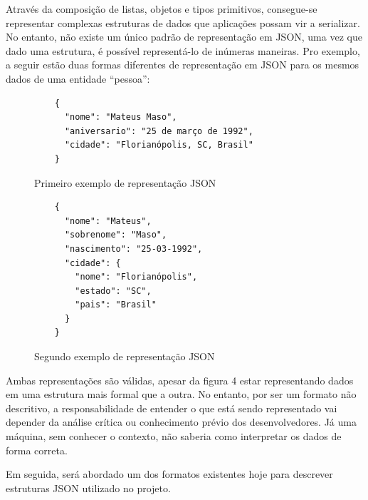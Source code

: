 \begin{table}[H]
  \centering
  \caption{Exemplo de tipos de valores em JSON}
\end{table}

Através da composição de listas, objetos e tipos primitivos, consegue-se representar complexas estruturas de dados que aplicações possam vir a serializar. No entanto, não existe um único padrão de representação em JSON, uma vez que dado uma estrutura, é possível representá-lo de inúmeras maneiras. Pro exemplo, a seguir estão duas formas diferentes de representação em JSON para os mesmos dados de uma entidade “pessoa”:
 \cite{Droettboom2015}

\begin{figure}[H]
  \centering
  \begin{verbatim}
    {
      "nome": "Mateus Maso",
      "aniversario": "25 de março de 1992",
      "cidade": "Florianópolis, SC, Brasil"
    }
  \end{verbatim}
  \caption{Primeiro exemplo de representação JSON}
\end{figure}

\begin{figure}[H]
  \centering
  \begin{verbatim}
    {
      "nome": "Mateus",
      "sobrenome": "Maso",
      "nascimento": "25-03-1992",
      "cidade": {
        "nome": "Florianópolis",
        "estado": "SC",
        "pais": "Brasil"
      }
    }
  \end{verbatim}
  \caption{Segundo exemplo de representação JSON}
\end{figure}

Ambas representações são válidas, apesar da figura 4 estar representando dados em uma estrutura mais formal que a outra. No entanto, por ser um formato não descritivo, a responsabilidade de entender o que está sendo representado vai depender da análise crítica ou conhecimento prévio dos desenvolvedores. Já uma máquina, sem conhecer o contexto, não saberia como interpretar os dados de forma correta. \cite{Droettboom2015}

Em seguida, será abordado um dos formatos existentes hoje para descrever estruturas JSON utilizado no projeto.


